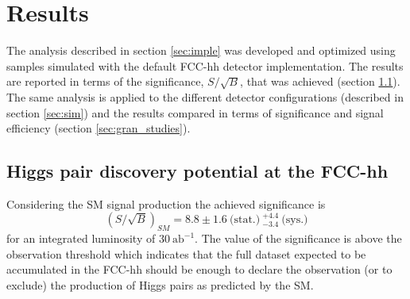 
\section{Results}
\label{sec:resul}


The analysis described in section \ref{sec:imple} was developed and optimized using samples simulated with the default FCC-hh detector implementation. The results are reported in terms of the significance, $S/\sqrt{B}$, that was achieved (section \ref{sec:results_FCC}). The same analysis is applied to the different detector configurations (described in section \ref{sec:sim}) and the results compared in terms of significance and signal efficiency (section \ref{sec:gran_studies}).  

\subsection{Higgs pair discovery potential at the FCC-hh}
\label{sec:results_FCC}

Considering the SM signal production the achieved significance is
\begin{equation}
	(S/\sqrt{B})_{SM}=8.8\pm 1.6~\text{(stat.)}~^{+4.4}_{-3.4}~\text{(sys.)}
\end{equation}
for an integrated luminosity of $30~\text{ab}^{-1}$. The value of the significance is above the observation threshold which indicates that the full dataset expected to be accumulated in the FCC-hh should be enough to declare the observation (or to exclude) the production of Higgs pairs as predicted by the SM.


